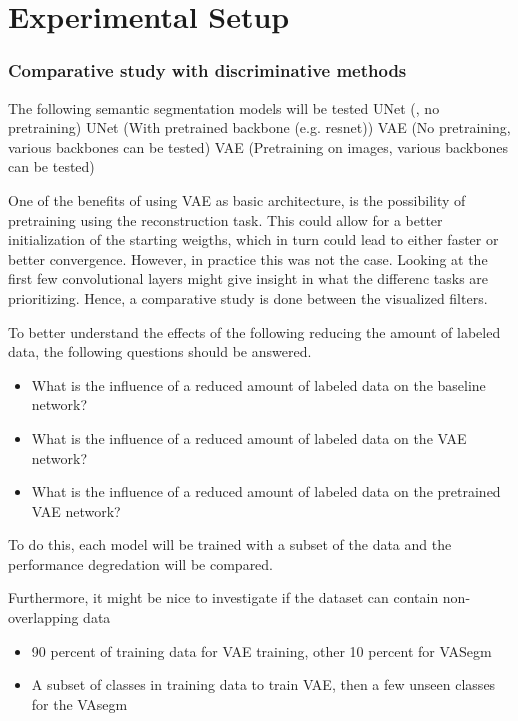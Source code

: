 \chapter{Experimental Setup}\label{chapter:second_real_chapter}


\subsection*{Comparative study with discriminative methods}
The following semantic segmentation models will be tested
UNet (\cite{ronneberger2015u}, no pretraining)
UNet (With pretrained backbone (e.g. resnet))
VAE (No pretraining, various backbones can be tested)
VAE (Pretraining on images, various backbones can be tested)

One of the benefits of using VAE as basic architecture, is the possibility of pretraining using the reconstruction task. This could allow for a better initialization of the starting weigths, which in turn could lead to either faster or better convergence. However, in practice this was not the case. Looking at the first few convolutional layers might give insight in what the differenc tasks are prioritizing. Hence, a comparative study is done between the visualized filters.

To better understand the effects of the following reducing the amount of labeled data, the following questions should be answered.
\begin{itemize}
    \item What is the influence of a reduced amount of labeled data on the baseline network?
    \item What is the influence of a reduced amount of labeled data on the VAE network?
    \item What is the influence of a reduced amount of labeled data on the pretrained VAE network?
\end{itemize}
To do this, each model will be trained with a subset of the data and the performance degredation will be compared.


Furthermore, it might be nice to investigate if the dataset can contain non-overlapping data
\begin{itemize}
    \item 90 percent of training data for VAE training, other 10 percent for VASegm
    \item A subset of classes in training data to train VAE, then a few unseen classes for the VAsegm
\end{itemize}

